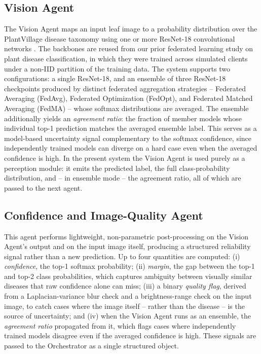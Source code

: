 \documentclass[conference]{IEEEtran}
\begin{document}
\subsection{Vision Agent}
The Vision Agent maps an input leaf image to a probability distribution over the PlantVillage disease taxonomy using one or more ResNet-18 convolutional networks \cite{r_he2016}. The backbones are reused from our prior federated learning study on plant disease classification, in which they were trained across simulated clients under a non-IID partition of the training data. The system supports two configurations: a single ResNet-18, and an ensemble of three ResNet-18 checkpoints produced by distinct federated aggregation strategies -- Federated Averaging (FedAvg), Federated Optimization (FedOpt), and Federated Matched Averaging (FedMA) -- whose softmax distributions are averaged. The ensemble additionally yields an \emph{agreement ratio}: the fraction of member models whose individual top-1 prediction matches the averaged ensemble label. This serves as a model-based uncertainty signal complementary to the softmax confidence, since independently trained models can diverge on a hard case even when the averaged confidence is high. In the present system the Vision Agent is used purely as a perception module: it emits the predicted label, the full class-probability distribution, and -- in ensemble mode -- the agreement ratio, all of which are passed to the next agent.

\subsection{Confidence and Image-Quality Agent}
This agent performs lightweight, non-parametric post-processing on the Vision Agent's output and on the input image itself, producing a structured reliability signal rather than a new prediction. Up to four quantities are computed: (i) \emph{confidence}, the top-1 softmax probability; (ii) \emph{margin}, the gap between the top-1 and top-2 class probabilities, which captures ambiguity between visually similar diseases that raw confidence alone can miss; (iii) a binary \emph{quality flag}, derived from a Laplacian-variance blur check and a brightness-range check on the input image, to catch cases where the image itself -- rather than the disease -- is the source of uncertainty; and (iv) when the Vision Agent runs as an ensemble, the \emph{agreement ratio} propagated from it, which flags cases where independently trained models disagree even if the averaged confidence is high. These signals are passed to the Orchestrator as a single structured object.
\end{document}
